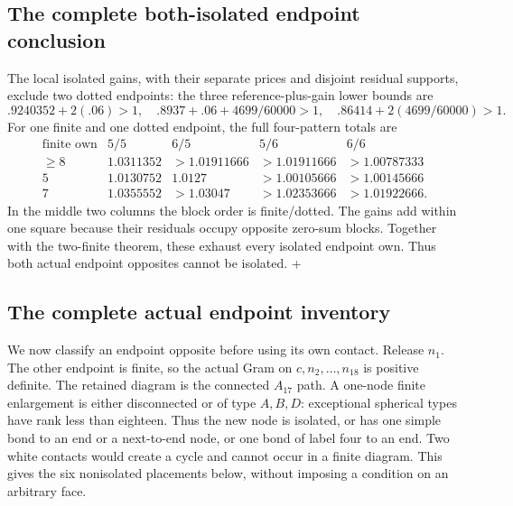 \subsection{The complete both-isolated endpoint conclusion}
The local isolated gains, with their separate
prices and disjoint residual supports, exclude
two dotted endpoints:
the three reference-plus-gain lower bounds are
\[
 .9240352+2(.06)>1,\quad
 .8937+.06+4699/60000>1,\quad
 .86414+2(4699/60000)>1.
\]
For one finite and one dotted endpoint, the
full four-pattern totals are
\[
\begin{array}{c|c|c|c|c}
\text{finite own}&5/5&6/5&5/6&6/6\\ \hline
\geq8&1.0311352&>1.01911666&>1.01911666&>1.00787333\\
5&1.0130752&1.0127&>1.00105666&>1.00145666\\
7&1.0355552&>1.03047&>1.02353666&>1.01922666.
\end{array}
\]
In the middle two columns the block order
is finite/dotted. The gains add within
one square because their residuals occupy
opposite zero-sum blocks.
Together with the two-finite theorem,
these exhaust every isolated endpoint own.
Thus both actual endpoint opposites cannot
be isolated.
+
\subsection{The complete actual endpoint inventory}
\label{app:A18endpointinventory}
We now classify an endpoint opposite before using its own contact.
Release \(n_1\). The other endpoint is finite, so the actual Gram on
\(c,n_2,\ldots,n_{18}\) is positive definite. The retained diagram is
the connected \(A_{17}\) path. A one-node finite enlargement is either
disconnected or of type \(A,B,D\): exceptional spherical types have
rank less than eighteen. Thus the new node is isolated, or has one
simple bond to an end or a next-to-end node, or one bond of label four
to an end. Two white contacts would create a cycle and cannot occur
in a finite diagram. This gives the six nonisolated placements below,
without imposing a condition on an arbitrary face.

